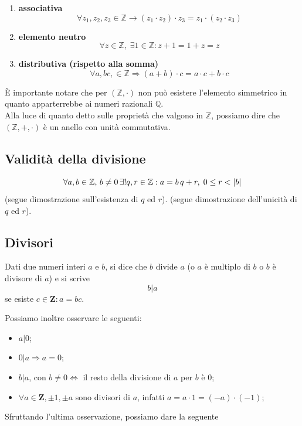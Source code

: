 \begin{flushleft}
\begin{enumerate}
    \item \textbf{associativa} \[\forall z_1,z_2,z_3 \in \mathbb{Z}\rightarrow (z_1 \cdot z_2) \cdot z_3 = z_1 \cdot (z_2 \cdot z_3)\]
    
    \item \textbf{elemento neutro} \[\forall z \in \mathbb{Z},\;\exists 1\in \mathbb{Z}:z+1=1+z=z\]
    
    \item \textbf{distributiva (rispetto alla somma)} \[\forall a,bc, \in \mathbb{Z} \Rightarrow(a+b) \cdot c = a\cdot c + b \cdot c\]
\end{enumerate}
È importante notare che per $(\mathbb{Z,\cdot})$ non può esistere l'elemento simmetrico in quanto apparterrebbe ai numeri razionali $\mathbb{Q}$.\\
Alla luce di quanto detto sulle proprietà che valgono in $\mathbb{Z}$, possiamo dire che $(\mathbb{Z,+,\cdot})$ è un anello con unità commutativa.

\subsection{Validità della divisione}
\[\forall a,b \in \mathbb{Z},\,b\neq 0\,\exists! q,r\in \mathbb{Z}:a=b\,q +r,\;0\leq r<\abs{b}\]
(segue dimostrazione sull'esistenza di $q$ ed $r$).
\newpage
(segue dimostrazione dell'unicità di $q$ ed $r$).
\\ \vspace{300px}


\subsection{Divisori}
\begin{definizione} [Divisore]
Dati due numeri interi $a$ e $b$, si dice che $b$ divide $a$ (o $a$ è multiplo di $b$ o $b$ è divisore di $a$) e si scrive
\[b|a\]
se esiste $c\in \mathbf{Z}:a = bc$.
\end{definizione}
Possiamo inoltre osservare le seguenti:
\begin{itemize}
    \item $a|0$;
    \vspace{100px}
    \item $0|a\Rightarrow a = 0$;
    \vspace{100px}
    \item $b|a$, con $b\neq 0\Leftrightarrow$ il resto della divisione di $a$ per $b$ è $0$;
    \vspace{100px}
    \item $\forall a \in \mathbf{Z}, \pm 1,\pm a$ sono divisori di $a$, infatti $a = a\cdot 1 = (-a)\cdot(-1)$;
    \vspace{100px}
\end{itemize}
Sfruttando l'ultima osservazione, possiamo dare la seguente


\end{flushleft}
